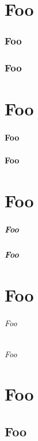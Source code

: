 \part{Foo}
\section{Foo}
\section{Foo}

\part{Foo}
\subsection{Foo}
\subsection{Foo}

\part{Foo}
\subsubsection{Foo}
\subsubsection{Foo}

\part{Foo}
\paragraph{Foo}
\paragraph{Foo}

\part{Foo}
\chapter{Foo}
